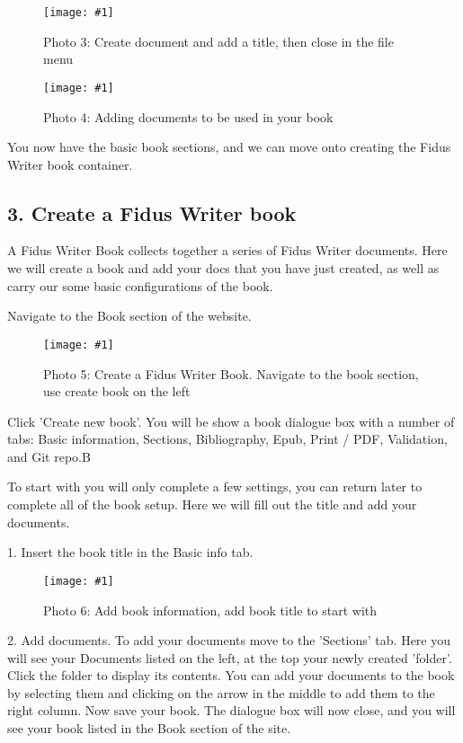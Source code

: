 \documentclass{article}
\newlength{\imgwidth}
\newcommand\scaledgraphics[2]{%
                
\settowidth{\imgwidth}{\texttt{[image: \#1]}}%
                
\setlength{\imgwidth}{\minof{\imgwidth}{#2\textwidth}}%
                
\texttt{[image: \#1]}%
                
}
\begin{document}
\begin{figure}
\scaledgraphics{ac6867d5-af90-4fcf-baf6-f48ad34c0de7.png}{1}
\caption*{Photo 3: Create document and add a title, then close in the file menu}\label{F72135581}
\end{figure}

\begin{figure}
\scaledgraphics{c6cd4404-ce9f-4c61-bbfe-cfc12b71dae7.png}{1}
\caption*{Photo 4: Adding documents to be used in your book}\label{F35194901}
\end{figure}


You now have the basic book sections, and we can move onto creating the Fidus Writer book container.


\subsection{3. Create a Fidus Writer book}\label{H642923}



A Fidus Writer Book collects together a series of Fidus Writer documents. Here we will create a book and add your docs that you have just created, as well as carry our some basic configurations of the book.


Navigate to the Book section of the website.

\begin{figure}
\scaledgraphics{d9710098-1829-44a3-b890-3fc28fe6ac91.png}{1}
\caption*{Photo 5: Create a Fidus Writer Book. Navigate to the book section, use create book on the left}\label{F94386831}
\end{figure}


Click 'Create new book'. You will be show a book dialogue box with a number of tabs: Basic information, Sections, Bibliography, Epub, Print / PDF, Validation, and Git repo.B


To start with you will only complete a few settings, you can return later to complete all of the book setup. Here we will fill out the title and add your documents.


1. Insert the book title in the Basic info tab.

\begin{figure}
\scaledgraphics{68440cbf-3463-417e-83a5-cd6a29532c0b.png}{1}
\caption*{Photo 6: Add book information, add book title to start with}\label{F90195231}
\end{figure}


2. Add documents. To add your documents move to the 'Sections' tab. Here you will see your Documents listed on the left, at the top your newly created 'folder'. Click the folder to display its contents. You can add your documents to the book by selecting them and clicking on the arrow in the middle to add them to the right column. Now save your book. The dialogue box will now close, and you will see your book listed in the Book section of the site.
\end{document}
